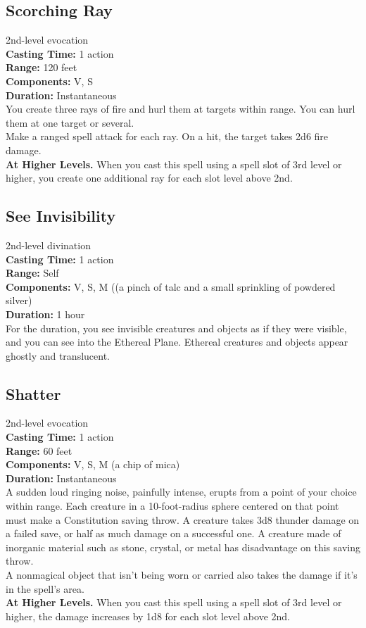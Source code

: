 \documentclass[11pt, A4paper, english]{article}
\begin{document}
		\subsection{Scorching Ray}
2nd-level evocation \\
\textbf{Casting Time:} 1 action \\
\textbf{Range:} 120 feet \\
\textbf{Components:} V, S \\
\textbf{Duration:} Instantaneous \\
You create three rays of fire and hurl them at targets within range. You can hurl them at one target or several. \\
Make a ranged spell attack for each ray. On a hit, the target takes 2d6 fire damage. \\
\textbf{At Higher Levels.} When you cast this spell using a spell slot of 3rd level or higher, you create one additional ray for each slot level above 2nd.

		\subsection{See Invisibility}
2nd-level divination \\
\textbf{Casting Time:} 1 action \\
\textbf{Range:} Self \\
\textbf{Components:} V, S, M ((a pinch of talc and a small sprinkling of powdered silver) \\
\textbf{Duration:} 1 hour \\
For the duration, you see invisible creatures and objects as if they were visible, and you can see into the Ethereal Plane. Ethereal creatures and objects appear ghostly and translucent.

		\subsection{Shatter}
2nd-level evocation \\
\textbf{Casting Time:} 1 action \\
\textbf{Range:} 60 feet \\
\textbf{Components:} V, S, M (a chip of mica) \\
\textbf{Duration:} Instantaneous \\
A sudden loud ringing noise, painfully intense, erupts from a point of your choice within range. Each creature in a 10-foot-radius sphere centered on that point must make a Constitution saving throw. A creature takes 3d8 thunder damage on a failed save, or half as much damage on a successful one. A creature made of inorganic material such as stone, crystal, or metal has disadvantage on this saving throw. \\
A nonmagical object that isn’t being worn or carried also takes the damage if it’s in the spell's area. \\
\textbf{At Higher Levels.} When you cast this spell using a spell slot of 3rd level or higher, the damage increases by 1d8 for each slot level above 2nd.
\end{document}

